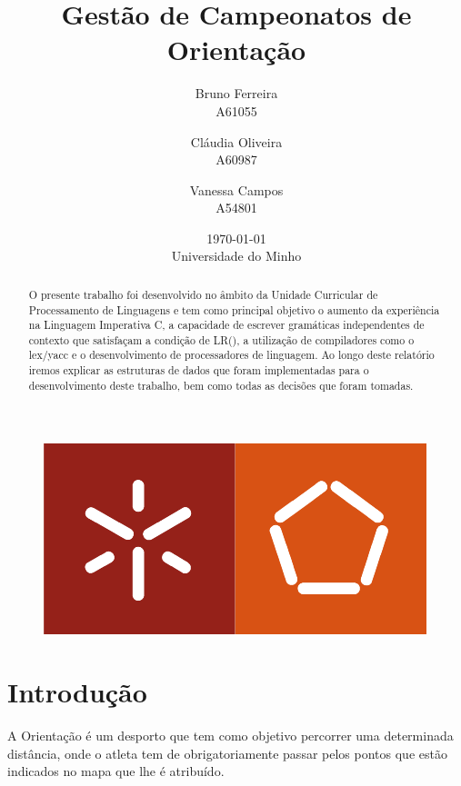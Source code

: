\documentclass[11pt, a4paper, oneside]{article}
\begin{document}
\title{Gestão de Campeonatos de Orientação}
\date{\today\\Universidade do Minho}
\author{
  Bruno Ferreira\\
  {\small A61055}\\
  \and
  Cláudia Oliveira\\
  {\small A60987}\\
  \and
  Vanessa Campos\\
  {\small A54801}\\
}

\maketitle

\begin{figure}[h]
\begin{center}
\includegraphics[width=0.4\linewidth]{logo}
\end{center}
\end{figure}


\begin{abstract}

  O presente trabalho foi desenvolvido no âmbito da Unidade Curricular de Processamento de Linguagens e tem como principal objetivo o aumento da experiência na Linguagem Imperativa C, a capacidade de escrever gramáticas independentes de contexto que satisfaçam a condição de LR(), a utilização de compiladores como o lex/yacc e o desenvolvimento de processadores de linguagem. Ao longo deste relatório iremos explicar as estruturas de dados que foram implementadas para o desenvolvimento deste trabalho, bem como todas as decisões que foram tomadas.

\end{abstract}
\newpage

\tableofcontents
\listoffigures 

\newpage
\section{Introdução}
A Orientação é um desporto que tem como objetivo percorrer uma determinada distância, onde o atleta tem de obrigatoriamente passar pelos pontos que estão indicados no mapa que lhe é atribuído.
\end{document}

